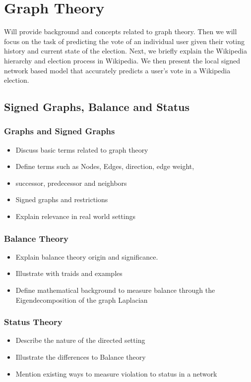 \chapter{Graph Theory} 
Will provide background and concepts related to graph theory. Then we will focus on the task of predicting the vote of an individual user given their voting history and current state of the election. Next, we briefly explain the Wikipedia hierarchy and election process in Wikipedia. We then present the local signed network based model that accurately predicts a user's vote in a Wikipedia election. 

\section{Signed Graphs, Balance and Status}
\subsection{Graphs and Signed Graphs }
\begin{itemize}
    \item Discuss basic terms related to graph theory 
    \item Define terms such as Nodes, Edges, direction, edge weight,
    \item successor, predecessor and neighbors
    \item Signed graphs and restrictions 
    \item Explain relevance in real world settings
\end{itemize}

\subsection{Balance Theory}
\begin{itemize}
    \item Explain balance theory origin and significance.
    \item Illustrate with traids and examples
    \item Define mathematical background to measure balance through the Eigendecomposition of the graph Laplacian  
\end{itemize}

\subsection{Status Theory}
\begin{itemize}
    \item Describe the nature of the directed setting
    \item Illustrate the differences to Balance theory
    \item Mention existing ways to measure violation to status in a network
\end{itemize}

